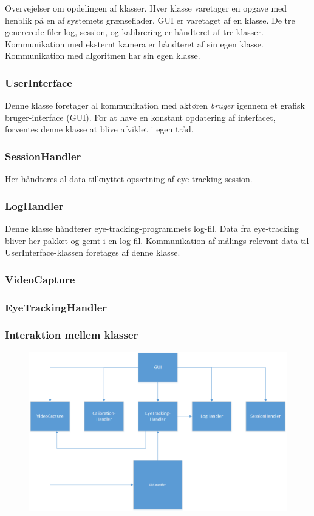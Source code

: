 \documentclass[rapport.tex]{subfiles}
\begin{document}
	Overvejelser om opdelingen af klasser. Hver klasse varetager en opgave med henblik på en af systemets grænseflader. GUI er varetaget af en klasse. De tre genererede filer log, session, og kalibrering er håndteret af tre klasser. Kommunikation med eksternt kamera er håndteret af sin egen klasse. Kommunikation med algoritmen har sin egen klasse. 
		\subsubsection{UserInterface}
		Denne klasse foretager al kommunikation med aktøren \textit{bruger} igennem et grafisk bruger-interface (GUI). For at have en konstant opdatering af interfacet, forventes denne klasse at blive afviklet i egen tråd. 
		\subsubsection{SessionHandler}
		Her håndteres al data tilknyttet opsætning af eye-tracking-session. 
		\subsubsection{LogHandler}
		Denne klasse håndterer eye-tracking-programmets log-fil. Data fra eye-tracking bliver her pakket og gemt i en log-fil. Kommunikation af målings-relevant data til UserInterface-klassen foretages af denne klasse.
		\subsubsection{VideoCapture}
		\subsubsection{EyeTrackingHandler}
	 
		
		\subsubsection{Interaktion mellem klasser}
		
		\begin{figure}
		\centering
		\includegraphics[width=0.8\linewidth]{klasseinteraktion}
		\caption{}
		\label{fig:klasseinteraktion}
		\end{figure}
\end{document}
